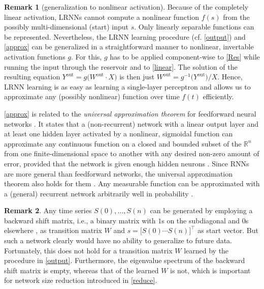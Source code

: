 \documentclass[preprint,12pt,times,authoryear]{elsarticle}%
\theoremstyle{definition}
\newtheorem{remk}{Remark}
\begin{document}
\begin{remk}[generalization to nonlinear activation]
Because of the completely linear activation, LRNNs cannot compute a nonlinear
function $f(s)$ from the possibly multi-dimensional (start) input $s$. Only linearly
separable functions can be represented. Nevertheless, the LRNN learning
procedure (cf. \cref{output}) and \cref{approx} can be generalized in a
straightforward manner to nonlinear, invertable activation functions $g$.
For this, $g$ has to be applied component-wise to \cref{Res} while running the
input through the reservoir and to \cref{linear}. The solution of the resulting
equation $Y^\mathrm{out} = g\big(W^\mathrm{out} \cdot X\big)$ is then just
$W^\mathrm{out} = g^{-1}\big(Y^\mathrm{out}\big)/X$. Hence, LRNN learning is as
easy as learning a single-layer perceptron and allows us to approximate any
(possibly nonlinear) function over time $f(t)$ efficiently. 
\end{remk}

\cref{approx} is related to the \emph{universal approximation theorem} for
feedforward neural networks \citep{Hor91}. It states that a (non-recurrent)
network with a linear output layer and at least one hidden layer activated by a
nonlinear, sigmoidal function can approximate any continuous function on a
closed and bounded subset of the $\mathbb{R}^n$ from one finite-dimensional
space to another with any desired non-zero amount of error, provided that the
network is given enough hidden neurons \citep[Sect.~6.4.1]{GBC16}. Since RNNs
are more general than feedforward networks, the universal approximation theorem
also holds for them \citep{MNM02}. Any measurable function can be
approximated with a (general) recurrent network arbitrarily well in probability
\citep{Ham00}.

\begin{remk}
Any time series $S(0),\dots,S(n)$ can be generated by employing a backward shift
matrix, i.e., a binary matrix with $1$s on the subdiagonal and $0$s elsewhere
\citep[Sect.~0.9.7]{HJ13}, as transition matrix $W$ and $s = \big[ S(0) \cdots
S(n) \big]^\top$ as start vector. But such a network clearly would have no
ability to generalize to future data. Fortunately, this does not hold for a
transition matrix $W$ learned by the procedure in \cref{output}. Furthermore,
the eigenvalue spectrum of the backward shift matrix is empty, whereas that of
the learned $W$ is not, which is important for network size reduction
introduced in \cref{reduce}.
\end{remk}
\end{document}
